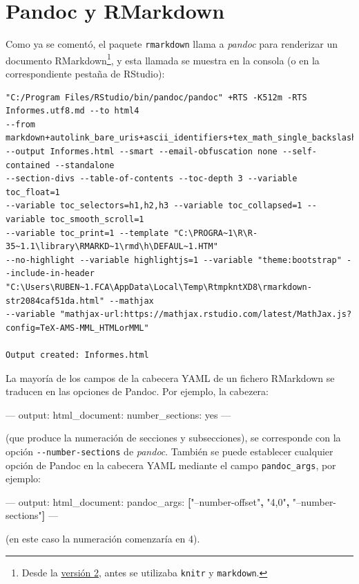 \documentclass[]{book}
\newenvironment{Shaded}{\begin{snugshade}}{\end{snugshade}}
\newcommand{\KeywordTok}[1]{\textcolor[rgb]{0.13,0.29,0.53}{\textbf{#1}}}
\newcommand{\StringTok}[1]{\textcolor[rgb]{0.31,0.60,0.02}{#1}}
\newcommand{\OtherTok}[1]{\textcolor[rgb]{0.56,0.35,0.01}{#1}}
\newcommand{\FunctionTok}[1]{\textcolor[rgb]{0.00,0.00,0.00}{#1}}
\newcommand{\AttributeTok}[1]{\textcolor[rgb]{0.77,0.63,0.00}{#1}}
\let\rmarkdownfootnote\footnote%
\def\footnote{\protect\rmarkdownfootnote}
\theoremstyle{definition}
\theoremstyle{definition}
\theoremstyle{definition}
\theoremstyle{remark}
\begin{document}
\section{Pandoc y RMarkdown}\label{pandoc-y-rmarkdown}

Como ya se comentó, el paquete \texttt{rmarkdown} llama a \emph{pandoc}
para renderizar un documento RMarkdown\footnote{Desde la
  \href{https://blog.rstudio.org/2014/06/18/r-markdown-v2/}{versión 2},
  antes se utilizaba \texttt{knitr} y \texttt{markdown}.}, y esta
llamada se muestra en la consola (o en la correspondiente pestaña de
RStudio):

\begin{verbatim}
"C:/Program Files/RStudio/bin/pandoc/pandoc" +RTS -K512m -RTS Informes.utf8.md --to html4 
--from markdown+autolink_bare_uris+ascii_identifiers+tex_math_single_backslash 
--output Informes.html --smart --email-obfuscation none --self-contained --standalone 
--section-divs --table-of-contents --toc-depth 3 --variable toc_float=1 
--variable toc_selectors=h1,h2,h3 --variable toc_collapsed=1 --variable toc_smooth_scroll=1 
--variable toc_print=1 --template "C:\PROGRA~1\R\R-35~1.1\library\RMARKD~1\rmd\h\DEFAUL~1.HTM"
--no-highlight --variable highlightjs=1 --variable "theme:bootstrap" --include-in-header
"C:\Users\RUBEN~1.FCA\AppData\Local\Temp\RtmpkntXD8\rmarkdown-str2084caf51da.html" --mathjax 
--variable "mathjax-url:https://mathjax.rstudio.com/latest/MathJax.js?config=TeX-AMS-MML_HTMLorMML"

Output created: Informes.html
\end{verbatim}

La mayoría de los campos de la cabecera YAML de un fichero RMarkdown se
traducen en las opciones de Pandoc. Por ejemplo, la cabezera:

\begin{Shaded}
\begin{Highlighting}[]
\OtherTok{---}
\FunctionTok{output:}
  \FunctionTok{html_document:}
    \FunctionTok{number_sections:}\AttributeTok{ yes      }
\OtherTok{---}
\end{Highlighting}
\end{Shaded}

(que produce la numeración de secciones y subsecciones), se corresponde
con la opción \texttt{-\/-number-sections} de \emph{pandoc}. También se
puede establecer cualquier opción de Pandoc en la cabecera YAML mediante
el campo \texttt{pandoc\_args}, por ejemplo:

\begin{Shaded}
\begin{Highlighting}[]
\OtherTok{---}
\FunctionTok{output:}
  \FunctionTok{html_document:}\AttributeTok{ }
    \FunctionTok{pandoc_args:}\AttributeTok{ }\KeywordTok{[}\StringTok{"--number-offset"}\KeywordTok{,} \StringTok{"4,0"}\KeywordTok{,} \StringTok{"--number-sections"}\KeywordTok{]}\AttributeTok{      }
\OtherTok{---}
\end{Highlighting}
\end{Shaded}

(en este caso la numeración comenzaría en 4).


\end{document}
